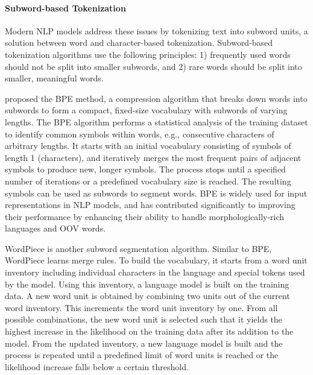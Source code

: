 \paragraph{Subword-based Tokenization} Modern NLP models address these issues by tokenizing text into subword units, a solution between word and character-based tokenization. Subword-based tokenization algorithms use the following principles: 1) frequently used words should not be split into smaller subwords, and 2) rare words should be split into smaller, meaningful words. 

\citet{gage1994new} proposed the \ac{BPE} method, a compression algorithm that breaks down words into subwords to form a compact, fixed-size vocabulary with subwords of varying lengths. The \ac{BPE} algorithm performs a statistical analysis of the training dataset to identify common symbols within words, e.g., consecutive characters of arbitrary lengths. It starts with an initial vocabulary consisting of symbols of length 1 (characters), and iteratively merges the most frequent pairs of adjacent symbols to produce new, longer symbols. The process stops until a specified number of iterations or a predefined vocabulary size is reached. The resulting symbols can be used as subwords to segment words. \ac{BPE} is widely used for input representations in \ac{NLP} models, and has contributed significantly to improving their performance by enhancing their ability to handle morphologically-rich languages and \ac{OOV} words.

WordPiece \citep{wu2016google} is another subword segmentation algorithm. Similar to \ac{BPE}, WordPiece learns merge rules. To build the vocabulary, it starts from a word unit inventory including individual characters in the language and special tokens used by the model. Using this inventory, a language model is built on the training data. A new word unit is obtained by combining two units out of the current word inventory. This increments the word unit inventory by one. From all possible combinations, the new word unit is selected such that it yields the highest increase in the likelihood on the training data after its addition to the model. From the updated inventory, a new language model is built and the process is repeated until a predefined limit of word units is reached or the likelihood increase falls below a certain threshold. 


